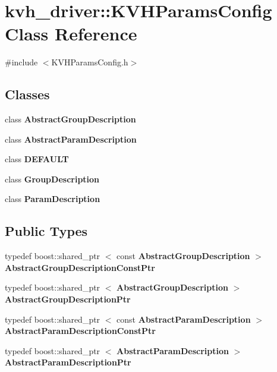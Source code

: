 \section{kvh\-\_\-driver\-:\-:\-K\-V\-H\-Params\-Config \-Class \-Reference}
\label{classkvh__driver_1_1KVHParamsConfig}


{\ttfamily \#include $<$\-K\-V\-H\-Params\-Config.\-h$>$}

\subsection*{\-Classes}
\begin{DoxyCompactItemize}
\item 
class {\bf \-Abstract\-Group\-Description}
\item 
class {\bf \-Abstract\-Param\-Description}
\item 
class {\bf \-D\-E\-F\-A\-U\-L\-T}
\item 
class {\bf \-Group\-Description}
\item 
class {\bf \-Param\-Description}
\end{DoxyCompactItemize}
\subsection*{\-Public \-Types}
\begin{DoxyCompactItemize}
\item 
typedef boost\-::shared\-\_\-ptr\*
$<$ const \*
{\bf \-Abstract\-Group\-Description} $>$ {\bf \-Abstract\-Group\-Description\-Const\-Ptr}
\item 
typedef boost\-::shared\-\_\-ptr\*
$<$ {\bf \-Abstract\-Group\-Description} $>$ {\bf \-Abstract\-Group\-Description\-Ptr}
\item 
typedef boost\-::shared\-\_\-ptr\*
$<$ const \*
{\bf \-Abstract\-Param\-Description} $>$ {\bf \-Abstract\-Param\-Description\-Const\-Ptr}
\item 
typedef boost\-::shared\-\_\-ptr\*
$<$ {\bf \-Abstract\-Param\-Description} $>$ {\bf \-Abstract\-Param\-Description\-Ptr}
\end{DoxyCompactItemize}

